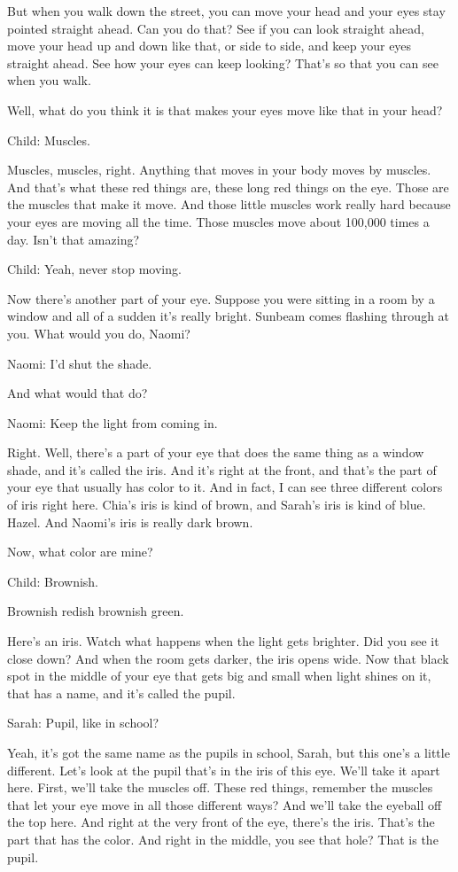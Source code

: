 But when you walk down the street, you can move your head and your eyes stay pointed straight ahead. Can you do that? See if you can look straight ahead, move your head up and down like that, or side to side, and keep your eyes straight ahead. See how your eyes can keep looking? That's so that you can see when you walk.

Well, what do you think it is that makes your eyes move like that in your head?

Child: Muscles.

Muscles, muscles, right. Anything that moves in your body moves by muscles. And that's what these red things are, these long red things on the eye. Those are the muscles that make it move. And those little muscles work really hard because your eyes are moving all the time. Those muscles move about 100,000 times a day. Isn't that amazing?

Child: Yeah, never stop moving.

Now there's another part of your eye. Suppose you were sitting in a room by a window and all of a sudden it's really bright. Sunbeam comes flashing through at you. What would you do, Naomi?

Naomi: I'd shut the shade.

And what would that do?

Naomi: Keep the light from coming in.

Right. Well, there's a part of your eye that does the same thing as a window shade, and it's called the iris. And it's right at the front, and that's the part of your eye that usually has color to it. And in fact, I can see three different colors of iris right here. Chia's iris is kind of brown, and Sarah's iris is kind of blue. Hazel. And Naomi's iris is really dark brown.

Now, what color are mine?

Child: Brownish.

Brownish redish brownish green.

Here's an iris. Watch what happens when the light gets brighter. Did you see it close down? And when the room gets darker, the iris opens wide. Now that black spot in the middle of your eye that gets big and small when light shines on it, that has a name, and it's called the pupil.

Sarah: Pupil, like in school?

Yeah, it's got the same name as the pupils in school, Sarah, but this one's a little different. Let's look at the pupil that's in the iris of this eye. We'll take it apart here. First, we'll take the muscles off. These red things, remember the muscles that let your eye move in all those different ways? And we'll take the eyeball off the top here. And right at the very front of the eye, there's the iris. That's the part that has the color. And right in the middle, you see that hole? That is the pupil.

